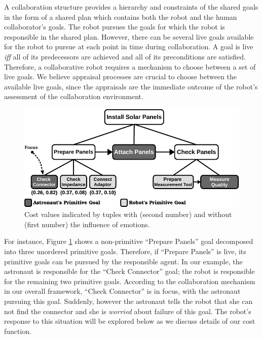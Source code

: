 \documentclass[12pt]{report}
\begin{document}
A collaboration structure provides a hierarchy and constraints of the shared
goals in the form of a shared plan which contains both the robot and the human
collaborator's goals. The robot pursues the goals for which the robot is
responsible in the shared plan. However, there can be several live goals
available for the robot to pursue at each point in time during collaboration. A
goal is live \textit{iff} all of its predecessors are achieved and all of its
preconditions are satisfied. Therefore, a collaborative robot requires a
mechanism to choose between a set of live goals. We believe appraisal processes
are crucial to choose between the available live goals, since the appraisals are
the immediate outcome of the robot's assessment of the collaboration environment.

\begin{figure}[t]
  \centering
  \includegraphics[width=1\textwidth]{figure/goal_management_collaboration_structure-croped.pdf}
  \caption{Cost values indicated by tuples with (second number) and without
  (first number) the influence of emotions.}
  \label{fig:task-model-astronaut}
\end{figure}

For instance, Figure \ref{fig:task-model-astronaut} shows a non-primitive
``Prepare Panels'' goal decomposed into three unordered primitive goals.
Therefore, if ``Prepare Panels'' is live, its primitive goals can be pursued by
the responsible agent. In our example, the astronaut is responsible for the
``Check Connector'' goal; the robot is responsible for the remaining two
primitive goals. According to the collaboration mechanism in our overall
framework, ``Check Connector'' is in focus, with the astronaut pursuing this
goal. Suddenly, however the astronaut tells the robot that she can not find the
connector and she is \textit{worried} about failure of this goal. The robot's
response to this situation will be explored below as we discuss details of our
cost function.
\end{document}
